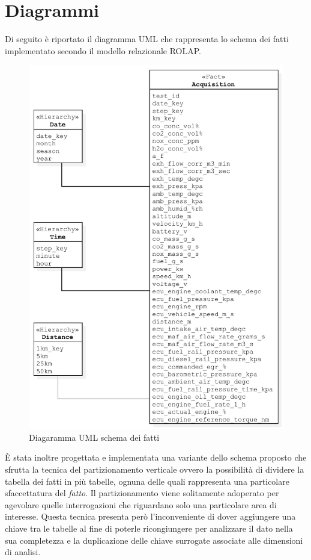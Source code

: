 \section{Diagrammi}
Di seguito è riportato il diagramma UML che rappresenta lo schema dei fatti implementato secondo il modello relazionale ROLAP.
\begin{figure}[H]
	\centering
	\includegraphics[width=1.\linewidth]{figures/class_fact_scheme}
	\caption{Diagaramma UML schema dei fatti}
	\label{fig:ofm}
\end{figure}
È stata inoltre progettata e implementata una variante dello schema proposto che sfrutta la tecnica del partizionamento verticale ovvero la possibilità di dividere la tabella dei fatti in più tabelle, ognuna delle quali rappresenta una particolare sfaccettatura del \textit{fatto}. Il partizionamento viene solitamente adoperato per agevolare quelle interrogazioni che riguardano solo una particolare area di interesse. Questa tecnica presenta però l'inconveniente di dover aggiungere una chiave tra le tabelle al fine di poterle ricongiungere per analizzare il dato nella sua completezza e la duplicazione delle chiave surrogate associate alle dimensioni di analisi.
